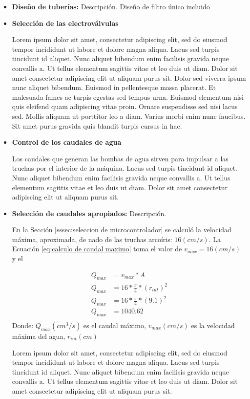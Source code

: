 \begin{itemize}
	
	\item \textbf{Diseño de tuberías:} Descripción.
	Diseño de filtro único incluido
	
	\item \textbf{Selección de las electroválvulas}
	
	Lorem ipsum dolor sit amet, consectetur adipiscing elit, sed do eiusmod tempor incididunt ut labore et dolore magna aliqua. Lacus sed turpis tincidunt id aliquet. Nunc aliquet bibendum enim facilisis gravida neque convallis a. Ut tellus elementum sagittis vitae et leo duis ut diam. Dolor sit amet consectetur adipiscing elit ut aliquam purus sit. Dolor sed viverra ipsum nunc aliquet bibendum. Euismod in pellentesque massa placerat. Et malesuada fames ac turpis egestas sed tempus urna. Euismod elementum nisi quis eleifend quam adipiscing vitae proin. Ornare suspendisse sed nisi lacus sed. Mollis aliquam ut porttitor leo a diam. Varius morbi enim nunc faucibus. Sit amet purus gravida quis blandit turpis cursus in hac.
	
	\item \textbf{Control de los caudales de agua}
	
	Los caudales que generan las bombas de agua sirven para impulsar a las truchas por el interior de la máquina. 
	Lacus sed turpis tincidunt id aliquet. Nunc aliquet bibendum enim facilisis gravida neque convallis a. Ut tellus elementum sagittis vitae et leo duis ut diam. Dolor sit amet consectetur adipiscing elit ut aliquam purus sit. 
	


	\item \textbf{Selección de caudales apropiados:} Descripción.
	
	


En la Sección \ref{sssec:seleccion de microcontrolador} se calculó la velocidad máxima, aproximada, de nado de las truchas arcoíris: $16 (cm/s)$. La Ecuación \ref{eq:calculo de caudal maximo} toma el valor de \textit{$v_{max}=16 (cm/s)$}  y el 

\begin{equation}\label{eq:calculo de caudal maximo}
	\begin{split}
		Q_{max} & = v_{max}*A \\
		Q_{max} & = 16*\frac{\pi}{4}*(r_{int})^2 \\
		Q_{max} & = 16*\frac{\pi}{4}*(9.1)^2 \\
		Q_{max} & = 1040.62 \\
	\end{split}		
\end{equation}
Donde: $Q_{max} (cm^3/s)$ es el caudal máximo, $v_{max} (cm/s)$ es la velocidad máxima del agua, $r_{int} (cm)$

Lorem ipsum dolor sit amet, consectetur adipiscing elit, sed do eiusmod tempor incididunt ut labore et dolore magna aliqua. Lacus sed turpis tincidunt id aliquet. Nunc aliquet bibendum enim facilisis gravida neque convallis a. Ut tellus elementum sagittis vitae et leo duis ut diam. Dolor sit amet consectetur adipiscing elit ut aliquam purus sit.	
	
\end{itemize}

